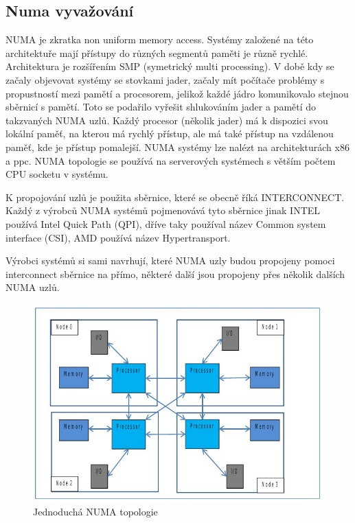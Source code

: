 \documentclass[
  master=true,
  font=sans,
  printversion=false,
  joinlists=true,
  figures=true,
  tables=true,
  sourcecodes=false,
  theorems=false,
  bibencoding=utf8,
  language=czech,
  encoding=utf8,
  field=ainfk,
  biblatex,
  glossaries,
  index
]{kidiplom}
\begin{document}
\newpage
\subsection{Numa vyvažování}

NUMA je zkratka non uniform memory access. Systémy založené na této architektuře mají přístupy do různých segmentů paměti je různě rychlé. Architektura je rozšířením SMP (symetrický multi processing). V době kdy se začaly objevovat systémy se stovkami jader, začaly mít počítače problémy s propustností mezi pamětí a procesorem, jelikož každé jádro komunikovalo stejnou sběrnicí s pamětí. Toto se podařilo vyřešit shlukováním jader a pamětí do takzvaných NUMA uzlů. Každý procesor (několik jader) má k dispozici svou lokální paměť, na kterou má rychlý přístup, ale má také přístup na vzdálenou paměť, kde je přístup pomalejší. NUMA systémy lze nalézt na architekturách x86 a ppc. NUMA topologie se používá na serverových systémech s větším počtem CPU socketu v systému.

K propojování uzlů je použita sběrnice, které se obecně říká INTERCONNECT. Každý z výrobců NUMA systémů pojmenovává tyto sběrnice jinak INTEL používá Intel Quick Path (QPI), dříve taky používal název Common system interface (CSI), AMD používá název Hypertransport.

Výrobci systémů si sami navrhují, které NUMA uzly budou propojeny pomoci interconnect sběrnice na přímo, některé další jsou propojeny přes několik dalších NUMA uzlů. 


\begin{figure}[ht]
\includegraphics[scale=0.78]{obrazky/numa-scheme.jpeg}
\caption{Jednoduchá NUMA topologie}
\label{numa scheme1}
\end{figure}
\end{document}
